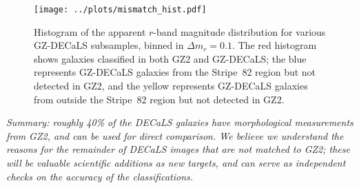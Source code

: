 \documentclass[iop,apj,tighten]{emulateapj}
\begin{document}
\begin{figure}
\centering
\texttt{[image: ../plots/mismatch\_hist.pdf]}
\caption{Histogram of the apparent $r$-band magnitude distribution for various GZ-DECaLS subsamples, binned in $\Delta m_r=0.1$. The red histogram shows galaxies classified in both GZ2 and GZ-DECaLS; the blue represents GZ-DECaLS galaxies from the Stripe~82 region but not detected in GZ2, and the yellow represents GZ-DECaLS galaxies from outside the Stripe~82 region but not detected in GZ2.\label{fig:mismatch_hist}}
\end{figure}

\emph{Summary: roughly 40\% of the DECaLS galaxies have morphological measurements from GZ2, and can be used for direct comparison. We believe we understand the reasons for the remainder of DECaLS images that are not matched to GZ2; these will be valuable scientific additions as new targets, and can serve as independent checks on the accuracy of the classifications.}
\end{document}
